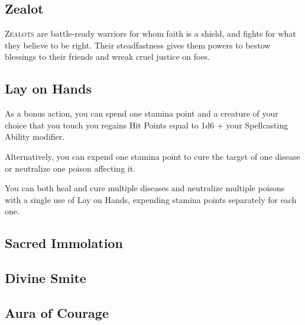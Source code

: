 
\begin{multicols*}{2}

\section{Zealot}

\lettrine[lines=3, lhang=0.15, loversize=0.25, findent=.5em]{Z}{ealots} are battle-ready warriors for whom faith is a shield, and fights for what they believe to be right. Their steadfastness gives them powers to bestow blessings to their friends and wreak cruel justice on foes.

\subsection*{Lay on Hands}

As a bonus action, you can spend one stamina point and a creature of your choice that you touch you regains Hit Points equal to 1d6 + your Spellcasting Ability modifier.

Alternatively, you can expend one stamina point to cure the target of one disease or neutralize one poison affecting it.

You can both heal and cure multiple diseases and neutralize multiple poisons with a single use of Lay on Hands, expending stamina points separately for each one.


\subsection*{Sacred Immolation}

\subsection*{Divine Smite}

\subsection*{Aura of Courage}


\end{multicols*}
